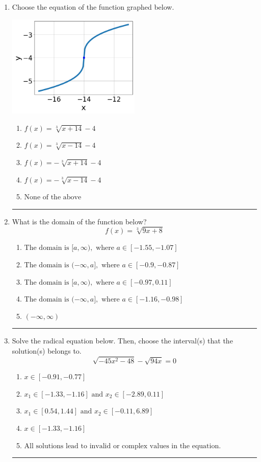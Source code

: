 \documentclass[14pt]{extbook}
\newcommand{\litem}[1]{\item#1\hspace*{-1cm}\rule{\textwidth}{0.4pt}}
\begin{document}
\begin{enumerate}
{\begin{enumerate}[label=\Alph*.]
\end{enumerate} }
\litem{
Choose the equation of the function graphed below.
\begin{center}
    \includegraphics[width=0.5\textwidth]{../Figures/radicalGraphToEquationCopyA.png}
\end{center}
\begin{enumerate}[label=\Alph*.]
\item \( f(x) = \sqrt[3]{x + 14} - 4 \)
\item \( f(x) = \sqrt[3]{x - 14} - 4 \)
\item \( f(x) = - \sqrt[3]{x + 14} - 4 \)
\item \( f(x) = - \sqrt[3]{x - 14} - 4 \)
\item \( \text{None of the above} \)

\end{enumerate} }
\litem{
What is the domain of the function below?\[ f(x) = \sqrt[3]{9 x + 8} \]\begin{enumerate}[label=\Alph*.]
\item \( \text{The domain is } [a, \infty), \text{   where } a \in [-1.55, -1.07] \)
\item \( \text{The domain is } (-\infty, a], \text{   where } a \in [-0.9, -0.87] \)
\item \( \text{The domain is } [a, \infty), \text{   where } a \in [-0.97, 0.11] \)
\item \( \text{The domain is } (-\infty, a], \text{   where } a \in [-1.16, -0.98] \)
\item \( (-\infty, \infty) \)

\end{enumerate} }
\litem{
Solve the radical equation below. Then, choose the interval(s) that the solution(s) belongs to.\[ \sqrt{-45 x^2 - 48} - \sqrt{94 x} = 0 \]\begin{enumerate}[label=\Alph*.]
\item \( x \in [-0.91,-0.77] \)
\item \( x_1 \in [-1.33, -1.16] \text{ and } x_2 \in [-2.89,0.11] \)
\item \( x_1 \in [0.54, 1.44] \text{ and } x_2 \in [-0.11,6.89] \)
\item \( x \in [-1.33,-1.16] \)
\item \( \text{All solutions lead to invalid or complex values in the equation.} \)


\end{enumerate}}
\end{enumerate}
\end{document}
